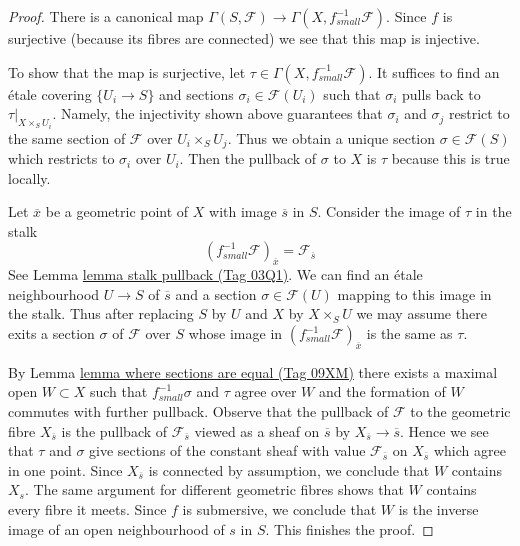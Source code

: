 \documentclass{amsart}
\theoremstyle{plain}
\theoremstyle{definition}
\theoremstyle{remark}
\numberwithin{equation}{subsection}
\begin{document}
\begin{proof}
There is a canonical map
$\Gamma(S, \mathcal{F}) \to \Gamma(X, f_{small}^{-1}\mathcal{F})$.
Since $f$ is surjective (because its fibres are connected) we see that
this map is injective.

\medskip\noindent
To show that the map is surjective, let
$\tau \in \Gamma(X, f_{small}^{-1}\mathcal{F})$.
It suffices to find
an \'etale covering $\{U_i \to S\}$ and
sections $\sigma_i \in \mathcal{F}(U_i)$
such that $\sigma_i$ pulls back to $\tau|_{X \times_S U_i}$.
Namely, the injectivity shown above guarantees
that $\sigma_i$ and $\sigma_j$ restrict to the same
section of $\mathcal{F}$ over $U_i \times_S U_j$.
Thus we obtain a unique section $\sigma \in \mathcal{F}(S)$
which restricts to $\sigma_i$ over $U_i$.
Then the pullback of $\sigma$ to $X$ is $\tau$
because this is true locally.

\medskip\noindent
Let $\overline{x}$ be a geometric point of $X$ with image $\overline{s}$
in $S$. Consider the image of $\tau$ in the stalk
$$
(f_{small}^{-1}\mathcal{F})_{\overline{x}} = \mathcal{F}_{\overline{s}}
$$
See Lemma \href{https://stacks.math.columbia.edu/tag/03Q1}{lemma stalk pullback (Tag 03Q1)}.
We can find an \'etale neighbourhood $U \to S$ of $\overline{s}$
and a section $\sigma \in \mathcal{F}(U)$ mapping to this image
in the stalk. Thus after replacing $S$ by $U$ and $X$ by $X \times_S U$
we may assume there exits a section $\sigma$ of $\mathcal{F}$ over $S$
whose image in $(f_{small}^{-1}\mathcal{F})_{\overline{x}}$ is the
same as $\tau$.

\medskip\noindent
By Lemma \href{https://stacks.math.columbia.edu/tag/09XM}{lemma where sections are equal (Tag 09XM)}
there exists a maximal open $W \subset X$ such that
$f_{small}^{-1}\sigma$ and $\tau$ agree over $W$
and the formation of $W$ commutes with further pullback.
Observe that the pullback of $\mathcal{F}$ to the
geometric fibre $X_{\overline{s}}$ is the pullback
of $\mathcal{F}_{\overline{s}}$ viewed as a sheaf on
$\overline{s}$ by $X_{\overline{s}} \to \overline{s}$.
Hence we see that $\tau$ and $\sigma$ give sections
of the constant sheaf with value $\mathcal{F}_{\overline{s}}$
on $X_{\overline{s}}$ which agree in one point. Since
$X_{\overline{s}}$ is connected by assumption, we conclude
that $W$ contains $X_s$. The same argument for different
geometric fibres shows that $W$ contains every fibre it meets.
Since $f$ is submersive, we conclude that $W$ is the inverse
image of an open neighbourhood of $s$ in $S$.
This finishes the proof.
\end{proof}
\end{document}

